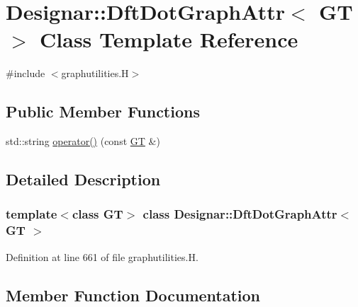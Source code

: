 \hypertarget{class_designar_1_1_dft_dot_graph_attr}{}\section{Designar\+:\+:Dft\+Dot\+Graph\+Attr$<$ GT $>$ Class Template Reference}
\label{class_designar_1_1_dft_dot_graph_attr}


{\ttfamily \#include $<$graphutilities.\+H$>$}

\subsection*{Public Member Functions}
\begin{DoxyCompactItemize}
\item 
std\+::string \hyperlink{class_designar_1_1_dft_dot_graph_attr_ab543d70d47040459bf4284e5cf8106f5}{operator()} (const \hyperlink{demo-buildgraph_8_c_a3001c40d2c31ca87ed96cd7d1334a55e}{GT} \&)
\end{DoxyCompactItemize}


\subsection{Detailed Description}
\subsubsection*{template$<$class GT$>$\newline
class Designar\+::\+Dft\+Dot\+Graph\+Attr$<$ G\+T $>$}



Definition at line 661 of file graphutilities.\+H.



\subsection{Member Function Documentation}
\mbox{\label{class_designar_1_1_dft_dot_graph_attr_ab543d70d47040459bf4284e5cf8106f5}} 

